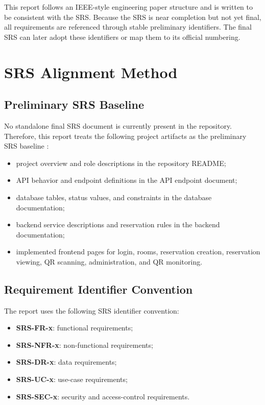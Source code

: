 \documentclass[conference]{IEEEtran}
\newcommand{\srs}[1]{\textbf{#1}}
\begin{document}
This report follows an IEEE-style engineering paper structure and is written
to be consistent with the SRS. Because the SRS is near completion but not yet
final, all requirements are referenced through stable preliminary identifiers.
The final SRS can later adopt these identifiers or map them to its official
numbering.

\section{SRS Alignment Method}
\subsection{Preliminary SRS Baseline}
No standalone final SRS document is currently present in the repository.
Therefore, this report treats the following project artifacts as the
preliminary SRS baseline \cite{roomlink_readme,roomlink_api,roomlink_database,roomlink_backend}:
\begin{itemize}
  \item project overview and role descriptions in the repository README;
  \item API behavior and endpoint definitions in the API endpoint document;
  \item database tables, status values, and constraints in the database
  documentation;
  \item backend service descriptions and reservation rules in the backend
  documentation;
  \item implemented frontend pages for login, rooms, reservation creation,
  reservation viewing, QR scanning, administration, and QR monitoring.
\end{itemize}

\subsection{Requirement Identifier Convention}
The report uses the following SRS identifier convention:
\begin{itemize}
  \item \srs{SRS-FR-x}: functional requirements;
  \item \srs{SRS-NFR-x}: non-functional requirements;
  \item \srs{SRS-DR-x}: data requirements;
  \item \srs{SRS-UC-x}: use-case requirements;
  \item \srs{SRS-SEC-x}: security and access-control requirements.
\end{itemize}
\end{document}
